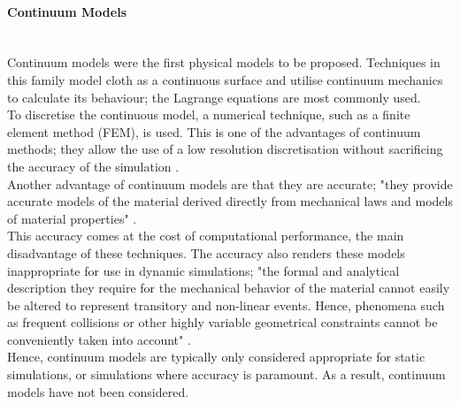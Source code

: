 \paragraph{Continuum Models}\leavevmode\\
Continuum models were the first physical models to be proposed. Techniques in this family model cloth as a continuous surface and utilise continuum mechanics to calculate its behaviour; the Lagrange equations are most commonly used.
\\To discretise the continuous model, a numerical technique, such as a finite element method (FEM), is used. This is one of the advantages of continuum methods; they allow the use of a low resolution discretisation without sacrificing the accuracy of the simulation \parencite[4-5]{Wacker2005a}.
\\Another advantage of continuum models are that they are accurate; "they provide accurate models of the material derived directly from mechanical laws and models of material properties" \parencite[200]{Magnenat-Thalmann2006}.
\\This accuracy comes at the cost of computational performance, the main disadvantage of these techniques. The accuracy also renders these models inappropriate for use in dynamic simulations; "the formal and analytical description they require for the mechanical behavior of the material cannot easily be altered to represent transitory and non-linear events. Hence, phenomena such as frequent collisions or other highly variable geometrical constraints cannot be conveniently taken into account" \parencite[200]{Magnenat-Thalmann2006}. 
\\Hence, continuum models are typically only considered appropriate for static simulations, or simulations where accuracy is paramount. As a result, continuum models have not been considered.

